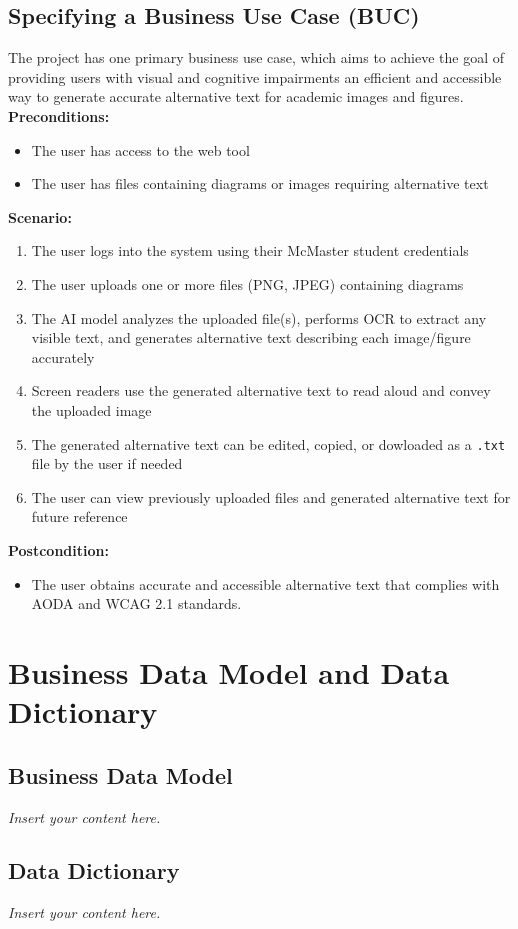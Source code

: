 \documentclass[12pt]{article}
\newcommand{\lips}{\textit{Insert your content here.}}
\begin{document}
\subsection{Specifying a Business Use Case (BUC)}
The project has one primary business use case, which aims to achieve the goal of providing users with visual and cognitive impairments an efficient 
and accessible way to generate accurate alternative text for academic images and figures.\\[1ex]
\textbf{Preconditions:}
\begin{itemize}
  \item The user has access to the web tool
  \item The user has files containing diagrams or images requiring alternative text
\end{itemize}
\textbf{Scenario:}
\begin{enumerate}
  \item The user logs into the system using their McMaster student credentials
  \item The user uploads one or more files (PNG, JPEG) containing diagrams 
  \item The AI model analyzes the uploaded file(s), performs OCR to extract any visible text, and generates 
  alternative text describing each image/figure accurately
  \item Screen readers use the generated alternative text to read aloud and convey the uploaded image
  \item The generated alternative text can be edited, copied, or dowloaded as a \texttt{.txt} file by the user if needed
  \item The user can view previously uploaded files and generated alternative text for future reference
\end{enumerate}
\textbf{Postcondition:}
\begin{itemize}
  \item The user obtains accurate and accessible alternative text that complies with AODA and WCAG 2.1 standards.
\end{itemize}

\section{Business Data Model and Data Dictionary}
\subsection{Business Data Model}
\lips
\subsection{Data Dictionary}
\lips
\end{document}
